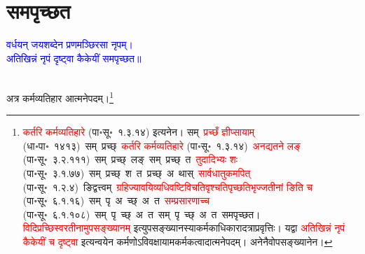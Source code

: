 \section[समपृच्छत]{समपृच्छत}
\centering\textcolor{blue}{वर्धयन् जयशब्देन प्रणमञ्छिरसा नृपम्।\nopagebreak\\
अतिखिन्नं नृपं दृष्ट्वा कैकेयीं समपृच्छत॥}\nopagebreak\\
\\
\fontsize{14}{21}\selectfont\begin{sloppypar}\justifying\noindent\hspace{10mm} अत्र कर्म\-व्यतिहार आत्मनेपदम्।\footnote{\textcolor{red}{कर्तरि कर्मव्यतिहारे} (पा॰सू॰~१.३.१४) इत्यनेन। सम्~\textcolor{red}{प्रच्छँ ज्ञीप्सायाम्} (धा॰पा॰~१४१३)~\arrow सम्~प्रच्छ्~\arrow \textcolor{red}{कर्तरि कर्मव्यतिहारे} (पा॰सू॰~१.३.१४)~\arrow \textcolor{red}{अनद्यतने लङ्} (पा॰सू॰~३.२.१११)~\arrow सम्~प्रच्छ्~लङ्~\arrow सम्~प्रच्छ्~त~\arrow \textcolor{red}{तुदादिभ्यः शः} (पा॰सू॰~३.१.७७)~\arrow सम्~प्रच्छ्~श~त~\arrow प्रच्छ्~अ~थास्~\arrow \textcolor{red}{सार्वधातुकमपित्} (पा॰सू॰~१.२.४)~\arrow ङिद्वत्त्वम्~\arrow \textcolor{red}{ग्रहिज्या\-वयिव्यधि\-वष्टिविचति\-वृश्चति\-पृच्छति\-भृज्जतीनां ङिति च} (पा॰सू॰~६.१.१६)~\arrow सम्~पृ~अ~च्छ्~अ~त~\arrow \textcolor{red}{सम्प्रसारणाच्च} (पा॰सू॰~६.१.१०८)~\arrow सम्~पृ~च्छ्~अ~त~\arrow सम्~पृ~च्छ्~अ~त~\arrow समपृच्छत। \textcolor{red}{विदि\-प्रच्छि\-स्वरतीनामुपसङ्ख्यानम्} इत्युप\-सङ्ख्यानस्याकर्मकाधिकारादत्राप्रवृत्तिः। यद्वा \textcolor{red}{अतिखिन्नं नृपं कैकेयीं च दृष्ट्वा} इत्यन्वयेन कर्मणोऽविवक्षायामकर्मकत्वादात्मने\-पदम्। अनेनैवोप\-सङ्ख्यानेन।}\end{sloppypar}
